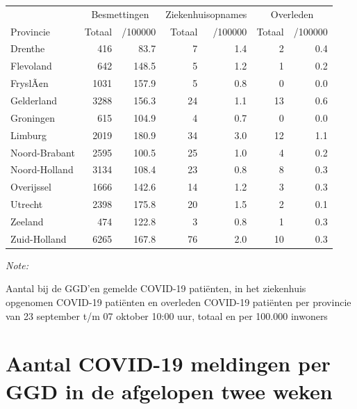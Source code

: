 \documentclass[
  english,
  man,floatsintext]{apa6}
\begin{document}
\begin{table}
\centering
\begin{threeparttable}
\begin{tabular}{lrrrrrr}
\toprule
\multicolumn{1}{c}{ } & \multicolumn{2}{c}{Besmettingen} & \multicolumn{2}{c}{Ziekenhuisopnames} & \multicolumn{2}{c}{Overleden} \\
\cmidrule(l{3pt}r{3pt}){2-3} \cmidrule(l{3pt}r{3pt}){4-5} \cmidrule(l{3pt}r{3pt}){6-7}
Provincie & Totaal & /100000 & Totaal & /100000 & Totaal & /100000\\
\midrule
Drenthe & 416 & 83.7 & 7 & 1.4 & 2 & 0.4\\
Flevoland & 642 & 148.5 & 5 & 1.2 & 1 & 0.2\\
FryslÃ¢n & 1031 & 157.9 & 5 & 0.8 & 0 & 0.0\\
Gelderland & 3288 & 156.3 & 24 & 1.1 & 13 & 0.6\\
Groningen & 615 & 104.9 & 4 & 0.7 & 0 & 0.0\\
Limburg & 2019 & 180.9 & 34 & 3.0 & 12 & 1.1\\
Noord-Brabant & 2595 & 100.5 & 25 & 1.0 & 4 & 0.2\\
Noord-Holland & 3134 & 108.4 & 23 & 0.8 & 8 & 0.3\\
Overijssel & 1666 & 142.6 & 14 & 1.2 & 3 & 0.3\\
Utrecht & 2398 & 175.8 & 20 & 1.5 & 2 & 0.1\\
Zeeland & 474 & 122.8 & 3 & 0.8 & 1 & 0.3\\
Zuid-Holland & 6265 & 167.8 & 76 & 2.0 & 10 & 0.3\\
\bottomrule
\end{tabular}
\begin{tablenotes}
\item \textit{Note: } 
\item Aantal bij de GGD’en gemelde COVID-19 patiënten, in het ziekenhuis opgenomen COVID-19 patiënten en overleden COVID-19 patiënten per provincie van 23 september t/m 07 oktober 10:00 uur, totaal en per 100.000 inwoners
\end{tablenotes}
\end{threeparttable}
\end{table}

\newpage

\hypertarget{aantal-covid-19-meldingen-per-ggd-in-de-afgelopen-twee-weken}{%
\section{Aantal COVID-19 meldingen per GGD in de afgelopen twee weken}\label{aantal-covid-19-meldingen-per-ggd-in-de-afgelopen-twee-weken}}
\end{document}
